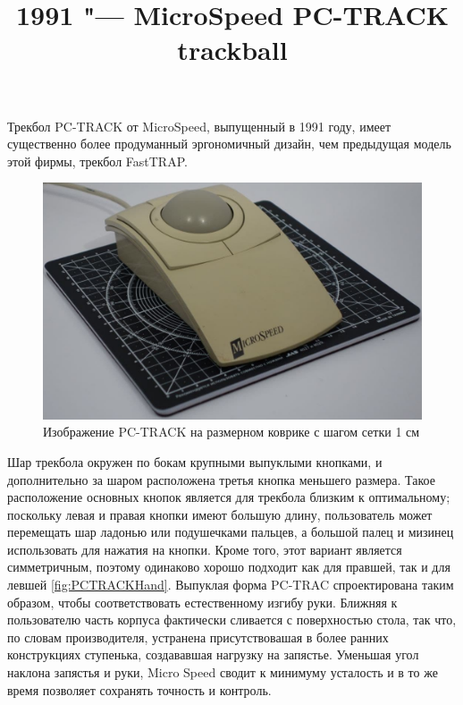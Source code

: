 \documentclass[11pt, a4paper]{article}
\begin{document}
\title{1991 "--- MicroSpeed PC-TRACK trackball}
\date{}
\maketitle
Трекбол PC-TRACK от MicroSpeed, выпущенный в 1991 году, имеет существенно более продуманный эргономичный дизайн, чем предыдущая модель этой фирмы, трекбол FastTRAP.

\begin{figure}[h]
    \centering
    \includegraphics[scale=0.3]{1991_microspeed_pc-track/PC.jpg}
    \caption{Изображение PC-TRACK на размерном коврике с шагом сетки 1 см}
    \label{fig:PCTRACKSize}
\end{figure}

Шар трекбола окружен по бокам крупными выпуклыми кнопками, и дополнительно за шаром расположена третья кнопка меньшего размера. Такое расположение основных кнопок является для трекбола близким к оптимальному; поскольку левая и правая кнопки имеют большую длину, пользователь может перемещать шар ладонью или подушечками пальцев, а большой палец и мизинец использовать для нажатия на кнопки. Кроме того, этот вариант является симметричным, поэтому одинаково хорошо подходит как для правшей, так и для левшей \ref{fig:PCTRACKHand}. Выпуклая форма PC-TRAC спроектирована таким образом, чтобы соответствовать естественному изгибу руки. Ближняя к пользователю часть корпуса фактически сливается с поверхностью стола, так что, по словам производителя, устранена присутствовашая в более ранних конструкциях ступенька, создававшая нагрузку на запястье. Уменьшая угол наклона запястья и руки, Micro Speed сводит к минимуму усталость и в то же время позволяет сохранять точность и контроль.
\end{document}
